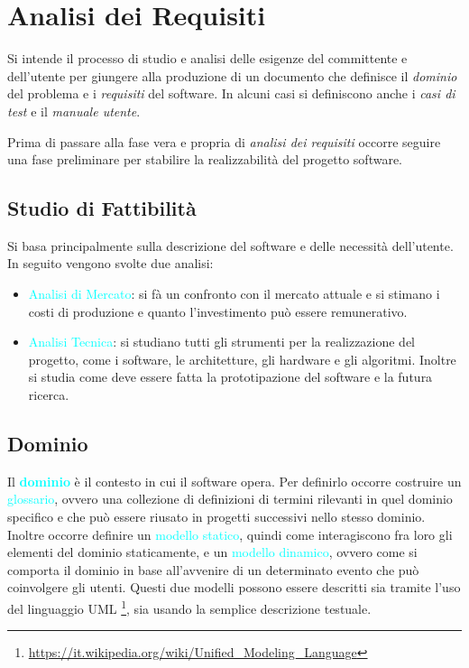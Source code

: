 \section{Analisi dei Requisiti}

\begin{definition}
    Si intende il processo di studio e analisi delle esigenze del committente e dell'utente per
    giungere alla produzione di un documento che definisce il \emph{dominio} del problema e i \emph{requisiti} del software.
    In alcuni casi si definiscono anche i \emph{casi di test} e il \emph{manuale utente}.
\end{definition}

Prima di passare alla fase vera e propria di \emph{analisi dei requisiti}
occorre seguire una fase preliminare per stabilire la realizzabilità
del progetto software.

\subsection{Studio di Fattibilità}

Si basa principalmente sulla descrizione del software e delle necessità
dell'utente. In seguito vengono svolte due analisi:

\begin{itemize}
    \item \textcolor{cyan}{Analisi di Mercato}: si fà un confronto con il mercato attuale e si stimano i costi di
        produzione e quanto l'investimento può essere remunerativo.
    \item \textcolor{cyan}{Analisi Tecnica}: si studiano tutti gli strumenti per la realizzazione del progetto,
        come i software, le architetture, gli hardware e gli algoritmi. Inoltre si studia come deve essere fatta la prototipazione
        del software e la futura ricerca. 
\end{itemize}

\subsection{Dominio}

Il \textbf{\textcolor{cyan}{dominio}} è il contesto in cui il software opera. Per definirlo occorre costruire
un \textcolor{cyan}{glossario}, ovvero una collezione di definizioni di termini rilevanti in quel dominio specifico e
che può essere riusato in progetti successivi nello stesso dominio. Inoltre occorre definire un \textcolor{cyan}{modello statico},
quindi come interagiscono fra loro gli elementi del dominio staticamente, e un \textcolor{cyan}{modello dinamico}, ovvero come si comporta il dominio
in base all'avvenire di un determinato evento che può coinvolgere gli utenti. Questi due modelli possono essere descritti sia 
tramite l'uso del linguaggio UML \footnote{\url{https://it.wikipedia.org/wiki/Unified_Modeling_Language}}, sia usando la semplice descrizione testuale.


